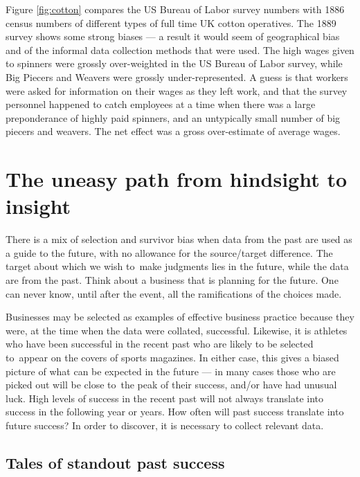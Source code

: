 \documentclass[
  10ptls,
  b5paper]{book}
\begin{document}
Figure \ref{fig:cotton} compares the US Bureau of Labor
survey numbers with 1886 census numbers of different types
of full time UK cotton operatives.
The 1889 survey shows some strong biases --- a result it
would seem of geographical bias and of the informal data
collection methods that were used. The high wages given to
spinners were grossly over-weighted in the US Bureau of
Labor survey, while Big Piecers and Weavers were grossly
under-represented. A guess is that workers were asked for
information on their wages as they left work, and that
the survey personnel happened to catch employees at a time
when there was a large preponderance of highly paid spinners,
and an untypically small number of big piecers and weavers.
The net effect was a gross over-estimate of average wages.

\hypertarget{the-uneasy-path-from-hindsight-to-insight}{%
\section{The uneasy path from hindsight to insight}\label{the-uneasy-path-from-hindsight-to-insight}}

There is a mix of selection and survivor bias when data
from the past are used as a guide to the future, with no
allowance for the source/target difference. The target about
which we wish to~make judgments lies in the future, while the
data are from the past. Think about a business that is
planning for the future. One can never know, until after the
event, all the ramifications of the choices made.

Businesses may be selected as examples of effective business
practice because they were, at the time when the data were
collated, successful. Likewise, it is athletes who have
been successful in the recent past who are likely to be
selected to~appear on the covers of sports magazines.
In either case, this gives a biased picture of what can be
expected in the future --- in many cases those who are
picked out will be close to~the peak of their success,
and/or have had unusual luck. High levels of success in
the recent past will not always translate into success
in the following year or years. How often will past
success translate into future success? In order to
discover, it is necessary to collect relevant data.

\hypertarget{tales-of-standout-past-success}{%
\subsection*{Tales of standout past success}\label{tales-of-standout-past-success}}
\end{document}
